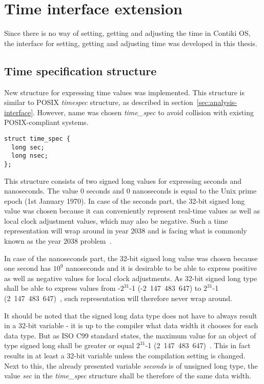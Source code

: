 
\section{Time interface extension}
Since there is no way of setting, getting and adjusting the time in Contiki OS,
the interface for setting, getting and adjusting time was developed in this thesis.


\subsection{Time specification structure}
New structure for expressing time values was implemented.
This structure is similar to POSIX {\it{timespec}} structure,
as described in section~\ref{sec:analysis-interface}.
However, name was chosen {\it{time\_spec}} to avoid collision with
existing POSIX-compliant systems.
\begin{lstlisting}
struct time_spec {
  long sec;
  long nsec;
};
\end{lstlisting}
This structure consists of two signed long values for expressing seconds and nanoseconds.
The value 0 seconds and 0 nanoseconds is equal to the Unix prime epoch (1st January 1970).
In case of the seconds part, the 32-bit signed long value was chosen because
it can conveniently
represent real-time values as well as local clock adjustment values, which may also be negative.
Such a time representation will wrap around in year 2038 and is facing
what is commonly known as the year 2038 problem~\cite{posix}.

In case of the nanoseconds part, the 32-bit signed long value was chosen because
one second has $10^9$ nanoseconds and it is
desirable to be able to express positive as well as negative values for local clock adjustments.
As 32-bit signed long type shall be able to express values from -$2^{31}$-1 (-2~147~483~647)
to $2^{31}$-1 (2~147~483~647)~\cite{c99},
such representation will therefore never wrap around.

It should be noted that the signed long data type does not have to always result in a 32-bit variable -
it is up to the compiler what data width it chooses for each data type.
But as ISO C99 standard states, the maximum value for an object of type signed long
shall be greater or equal $2^{31}$-1 (2~147~483~647)~\cite{c99}.
This in fact results in at least a 32-bit variable unless the compilation setting is changed.
Next to this, the already presented variable {\it{seconds}} is of unsigned long type,
the value {\it{sec}} in the {\it{time\_spec}} structure %
shall be therefore of the same data width.

